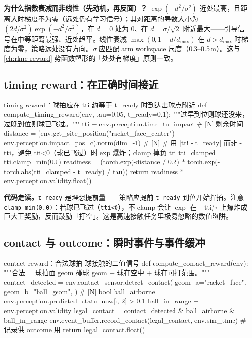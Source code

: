 \textbf{为什么指数衰减而非线性（先动机，再反面）？} $\exp(-d^2/\sigma^2)$ 近处最高，且距离大时梯度不为零（远处仍有学习信号）；其对距离的导数大小为 $(2d/\sigma^2)\exp(-d^2/\sigma^2)$，在 $d=0$ 处为 0、在 $d=\sigma/\sqrt{2}$ 附近最大——引导信号在中等距离最强、近处趋平。线性衰减 $\max(0,1-d/d_{\max})$ 在 $d>d_{\max}$ 时梯度为零，策略远处没有方向。$\sigma$ 应匹配 arm workspace 尺度（0.3--0.5\,m）。这与 \cref{ch:rlmc-reward} 势函数塑形的「处处有梯度」原则一致。

\subsection{timing reward：在正确时间接近}

\begin{codebox}[Python]{timing reward：球拍应在 tti 约等于 t\_ready 时到达击球点附近}
def compute_timing_reward(env, tau=0.05, t_ready=0.1):
    """过早到位则球还没来，过晚到位则球已飞过。"""
    tti = env.perception.time_to_impact           # [N] 剩余时间
    distance = (env.get_site_position("racket_face_center")
                - env.perception.impact_pos_c).norm(dim=-1)  # [N]
    # 用 |tti - t_ready| 而非 -tti，避免 tti<0（球已飞过）时 exp 爆炸；clamp 掉负 tti
    tti_clamped = tti.clamp_min(0.0)
    readiness = (torch.exp(-distance / 0.2)
                 * torch.exp(-torch.abs(tti_clamped - t_ready) / tau))
    return readiness * env.perception.validity.float()
\end{codebox}

\textbf{代码走读。}\verb|t_ready| 是理想提前量——策略应提前 \verb|t_ready| 到位开始挥拍。注意 \verb|clamp_min(0.0)|：若球已飞过（\verb|tti<0|），不 clamp 会让 $\exp$ 在 $-\text{tti}/\tau$ 上爆炸成巨大正奖励，反而鼓励「打空」。这是高速接触任务里极易忽略的数值陷阱。

\subsection{contact 与 outcome：瞬时事件与事件缓冲}

\begin{codebox}[Python]{contact reward：合法球拍-球接触的二值信号}
def compute_contact_reward(env):
    """合法 = 球拍面 geom 碰球 geom + 球在空中 + 球在可打范围。"""
    contact_detected = env.contact_sensor.detect_contact(
        geom_a="racket_face", geom_b="ball_geom",
    )                                                  # [N] bool
    ball_airborne = env.perception.predicted_state_now[:, 2] > 0.1
    ball_in_range = env.perception.validity
    legal_contact = contact_detected & ball_airborne & ball_in_range
    env.event_buffer.record_contact(legal_contact, env.sim_time)  # 记录供 outcome 用
    return legal_contact.float()
\end{codebox}

